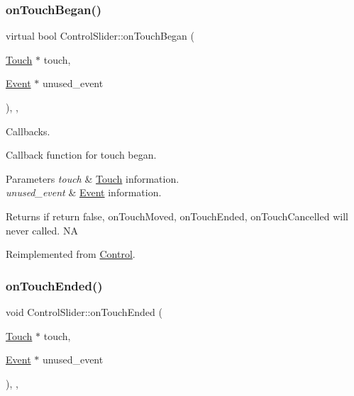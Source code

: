 \subsubsection{\texorpdfstring{on\+Touch\+Began()}{onTouchBegan()}\hspace{0.1cm}{\footnotesize\ttfamily [2/2]}}
{\footnotesize\ttfamily virtual bool Control\+Slider\+::on\+Touch\+Began (\begin{DoxyParamCaption}\item[{\hyperlink{classTouch}{Touch} $\ast$}]{touch,  }\item[{\hyperlink{classEvent}{Event} $\ast$}]{unused\+\_\+event }\end{DoxyParamCaption})\hspace{0.3cm}{\ttfamily [override]}, {\ttfamily [protected]}, {\ttfamily [virtual]}}



Callbacks. 

Callback function for touch began.


\begin{DoxyParams}{Parameters}
{\em touch} & \hyperlink{classTouch}{Touch} information. \\
\hline
{\em unused\+\_\+event} & \hyperlink{classEvent}{Event} information. \\
\hline
\end{DoxyParams}
\begin{DoxyReturn}{Returns}
if return false, on\+Touch\+Moved, on\+Touch\+Ended, on\+Touch\+Cancelled will never called.  NA 
\end{DoxyReturn}


Reimplemented from \hyperlink{classControl_a0cf2e20cea5b57b263e965be4a19ab52}{Control}.

\mbox{\label{classControlSlider_acdda8fa6365ab06db757c0a525c5108e}} 
\subsubsection{\texorpdfstring{on\+Touch\+Ended()}{onTouchEnded()}\hspace{0.1cm}{\footnotesize\ttfamily [1/2]}}
{\footnotesize\ttfamily void Control\+Slider\+::on\+Touch\+Ended (\begin{DoxyParamCaption}\item[{\hyperlink{classTouch}{Touch} $\ast$}]{touch,  }\item[{\hyperlink{classEvent}{Event} $\ast$}]{unused\+\_\+event }\end{DoxyParamCaption})\hspace{0.3cm}{\ttfamily [override]}, {\ttfamily [protected]}, {\ttfamily [virtual]}}

